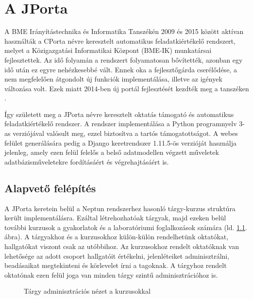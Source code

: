\chapter{A JPorta}\label{chapter:jporta}

A BME Irányítástechnika és Informatika Tanszékén 2009 és 2015 között aktívan használták a CPorta névre keresztelt automatikus feladatkiértékelő rendszert, melyet a Közigazgatási Informatikai Központ (BME-IK) munkatársai fejlesztettek. Az idő folyamán a rendszert folyamatosan bővítették, azonban egy idő után ez egyre nehézkesebbé vált. Ennek oka a fejlesztőgárda cserélődése, a nem megfelelően átgondolt új funkciók implementálása, illetve az igények változása volt. Ezek miatt 2014-ben új portál fejlesztését kezdték meg a tanszéken \cite{KalmanMsc}.

 Így született meg a JPorta névre keresztelt oktatás támogató és automatikus feladatkiértékelő rendszer. A rendszer implementálása a Python programnyelv 3-as verziójával valósult meg, ezzel biztosítva a tartós támogatottságot. A webes felület generálására pedig a Django \cite{Django} keretrendszer 1.11.5-ös verzióját használja jelenleg, amely ezen felül felelős a belső adatmodellen végzett műveletek adatbázisműveletekre fordításáért és végrehajtásáért is. 

 \section{Alapvető felépítés}

    A JPorta keretein belül a Neptun rendszerhez hasonló tárgy-kurzus struktúra került implementálásra. Ezáltal létrehozhatóak tárgyak, majd ezeken belül további kurzusok a gyakorlatok és a laboratóriumi foglalkozások számára (ld. \ref{fig:jporta_course}. ábra). A tárgyakhoz és a kurzusokhoz külön-külön rendelhetünk oktatókat, hallgatókat viszont csak az utóbbihoz. Az kurzusokhoz rendelt oktatóknak van lehetősége az adott csoport hallgatóit értékelni, jelenléteiket adminisztrálni, beadásaikat megtekinteni és körlevelet írni a tagoknak. A tárgyhoz rendelt oktatónak ezen felül joga van minden tárgy szintű adminisztrációhoz is.

     \begin{figure}[h]
        \centering
        \caption{Tárgy adminisztrációs nézet a kurzusokkal}
        \label{fig:jporta_course}
    \end{figure}    

